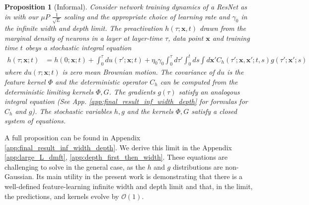 \documentclass{article} %
\def\x{\bm x}
\newtheorem{proposition}{Proposition}
\begin{document}
\begin{proposition}[Informal]
\label{prop:dmft_theory_expressions}
    Consider network training dynamics of a ResNet as in  with our $\mu P$ $\frac{1}{\sqrt{L}}$ scaling and the appropriate choice of learning rate and $\gamma_0$ in the infinite width and depth limit. The preactivation $h(\tau;\x,t)$ drawn from the marginal density of neurons in a layer at layer-time $\tau$, data point $\x$ and training time $t$ obeys a stochastic integral equation
    \begin{align}
         h(\tau;\x;t) &=  h(0;\x;t) +  \int_0^\tau du(\tau';\x;t) + \eta_0 \gamma_0 \int_0^\tau d\tau' \int_0^t ds  \int d\x' C_h(\tau';\x,\x';t,s) g(\tau';\x';s)  
    \end{align}
where $du(\tau;\x;t)$ is zero mean Brownian motion. The covariance of $du$ is the feature kernel $\Phi$ and the deterministic operator $C_h$ can be computed from the deterministic limiting kernels $\Phi, G$. The gradients $g(\tau)$ satisfy an analogous integral equation (See App. \ref{app:final_result_inf_width_depth} for formulas for $C_h$ and $g$). The stochastic variables $h,g$ and the kernels $\Phi, G$ satisfy a closed system of equations.
\end{proposition}
A full proposition can be found in Appendix \ref{app:final_result_inf_width_depth}. We derive this limit in the Appendix \ref{app:large_L_dmft}, \ref{app:depth_first_then_width}. These equations are challenging to solve in the general case, as the $h$ and $g$ distributions are non-Gaussian. 
% 
Its main utility in the present work is demonstrating that there is a well-defined feature-learning infinite width and depth limit and that, in the limit, the predictions, and kernels evolve by $\mathcal{O}(1)$. 
\end{document}
